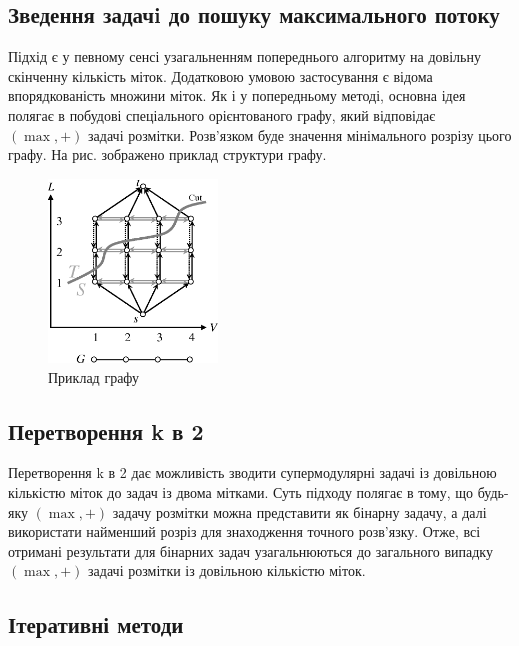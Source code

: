 \subsection{Зведення задачi до пошуку максимального потоку}

Підхід \cite{ishikawa} є у певному сенсі узагальненням попереднього алгоритму на довільну
скінченну кількість міток. Додатковою умовою застосування є відома впорядкованість
множини міток. Як і у попередньому методі, основна ідея  полягає в побудові
спеціального орієнтованого графу, який відповідає \((\max,+)\) задачі розмітки.
Розв'язком буде значення мінімального розрізу цього графу. На рис. 
зображено приклад структури графу.

\begin{figure}[h]
  \centering
  \includegraphics[width=0.4\textwidth]{images/ishikawa_graph.png}
  \caption{Приклад графу \cite{ishikawa}}
  \label{fig:graph_example_ishikawa}
\end{figure}


\subsection{Перетворення k в 2}

Перетворення k в 2 \cite{k22} дає можливість зводити супермодулярні задачі із
довільною кількістю міток до задач із двома мітками.
Суть підходу полягає в тому, що будь-яку \((\max,+)\) задачу розмітки можна
представити як бінарну задачу, а далі використати найменший розріз для знаходження
точного розв'язку. Отже, всі отримані результати для бінарних задач
узагальнюються до загального випадку \((\max,+)\) задачі розмітки із довільною
кількістю міток.

\subsection{Ітеративні методи}

